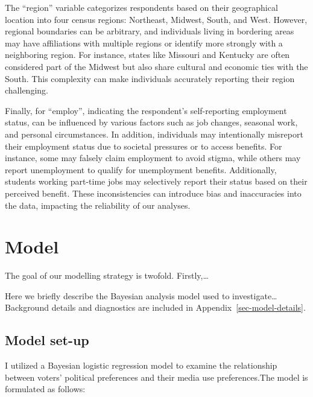 \documentclass[
  letterpaper,
  DIV=11,
  numbers=noendperiod]{scrartcl}
\begin{document}
The ``region'' variable categorizes respondents based on their
geographical location into four census regions: Northeast, Midwest,
South, and West. However, regional boundaries can be arbitrary, and
individuals living in bordering areas may have affiliations with
multiple regions or identify more strongly with a neighboring region.
For instance, states like Missouri and Kentucky are often considered
part of the Midwest but also share cultural and economic ties with the
South. This complexity can make individuals accurately reporting their
region challenging.

Finally, for ``employ'', indicating the respondent's self-reporting
employment status, can be influenced by various factors such as job
changes, seasonal work, and personal circumstances. In addition,
individuals may intentionally misreport their employment status due to
societal pressures or to access benefits. For instance, some may falsely
claim employment to avoid stigma, while others may report unemployment
to qualify for unemployment benefits. Additionally, students working
part-time jobs may selectively report their status based on their
perceived benefit. These inconsistencies can introduce bias and
inaccuracies into the data, impacting the reliability of our analyses.

\hypertarget{model}{%
\section{Model}\label{model}}

The goal of our modelling strategy is twofold. Firstly,\ldots{}

Here we briefly describe the Bayesian analysis model used to
investigate\ldots{} Background details and diagnostics are included in
Appendix~\ref{sec-model-details}.

\hypertarget{model-set-up}{%
\subsection{Model set-up}\label{model-set-up}}

I utilized a Bayesian logistic regression model to examine the
relationship between voters' political preferences and their media use
preferences.The model is formulated as follows:
\end{document}

